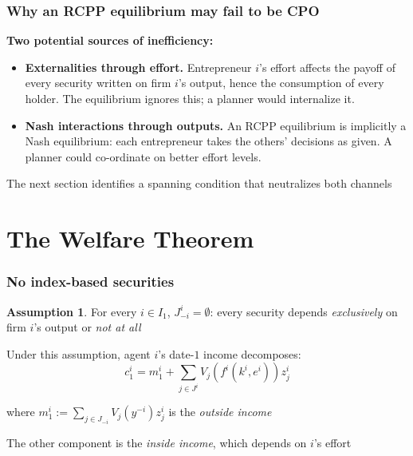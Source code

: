 \documentclass[blue]{beamer}
\theoremstyle{definition}
\newtheorem*{assumption}{Assumption}
\theoremstyle{example}
\begin{document}
\begin{frame}\frametitle{Why an RCPP equilibrium may fail to be CPO}
\textbf{Two potential sources of inefficiency:}
\bigskip

\begin{itemize}
\item \textbf{Externalities through effort.} Entrepreneur $i$'s effort affects the payoff of every security written on firm $i$'s output, hence the consumption of every holder. The equilibrium ignores this; a planner would internalize it.
\bigskip
\item \textbf{Nash interactions through outputs.} An RCPP equilibrium is implicitly a Nash equilibrium: each entrepreneur takes the others' decisions as given. A planner could co-ordinate on better effort levels.
\end{itemize}
\bigskip

The next section identifies a spanning condition that neutralizes both channels
\end{frame}

\section{The Welfare Theorem}

\begin{frame}\frametitle{No index-based securities}
\begin{assumption}
For every $i \in I_1$, $J^i_{-i} = \emptyset$: every security depends \emph{exclusively} on firm $i$'s output or \emph{not at all}
\end{assumption}
\bigskip

Under this assumption, agent $i$'s date-$1$ income decomposes:
\begin{equation*}
c^i_1 = m^i_1 + \sum_{j \in J^i} V_j(f^i(k^i, e^i)) z^i_j
\end{equation*}

where $m^i_1 := \sum_{j \in J_{-i}} V_j(y^{-i}) z^i_j$ is the \emph{outside income}
\bigskip

The other component is the \emph{inside income}, which depends on $i$'s effort
\end{frame}
\end{document}
